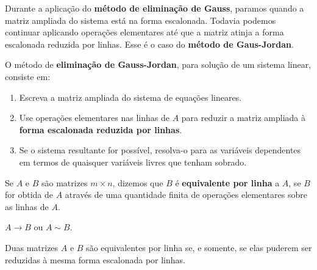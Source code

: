 \documentclass{beamer}
\begin{document}
    \begin{frame}
    Durante a aplicação do \textbf{método de eliminação de Gauss}, \pause paramos quando a matriz ampliada do sistema está na forma escalonada. \pause
    Todavia podemos continuar aplicando operações elementares \pause até que a matriz atinja a forma escalonada reduzida por linhas. \pause Esse é o caso do
    \textbf{método de Gaus-Jordan}.\pause

    \begin{definicao}
        O método de \textbf{eliminação de Gauss-Jordan}, \pause para solução de um sistema linear, consiste em:\pause
        \begin{enumerate}[label={\roman*})]
            \item Escreva a matriz ampliada do sistema de equações lineares.\pause

            \item Use operações elementares nas linhas de $A$ \pause para reduzir a matriz ampliada à \textbf{forma escalonada reduzida por linhas}.\pause

            \item Se o sistema resultante for possível, resolva-o para as variáveis dependentes em termos de quaisquer variáveis livres que tenham sobrado.
        \end{enumerate}
    \end{definicao}
\end{frame}

    \begin{frame}
        \begin{definicao}
            Se $A$ e $B$ são matrizes $m \times n$, \pause dizemos que $B$ é \textbf{equivalente por linha} \pause a $A$, \pause se $B$ for obtida de $A$ \pause através de uma quantidade finita de operações elementares sobre as linhas de $A$.\pause
        \end{definicao}

        \vspace{.6cm}

        \begin{notacao}
            $A \rightarrow B$ \pause ou $A \sim B$.
        \end{notacao}
    \end{frame}

    \begin{frame}
        \begin{teorema}
            Duas matrizes $A$ e $B$ são equivalentes por linha \pause se, e somente, se elas puderem ser reduzidas à mesma forma escalonada por linhas.
        \end{teorema}
    \end{frame}
\end{document}
